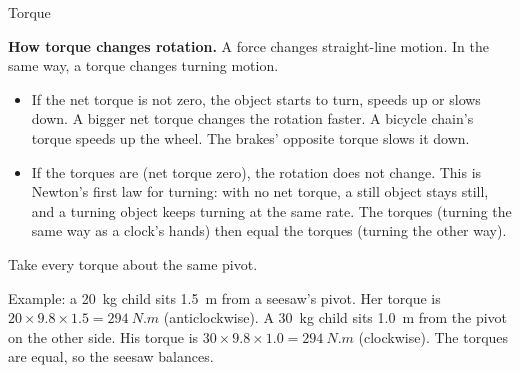 \begin{formulacard}{Torque}
  \begin{symbols}
  \end{symbols}
\end{formulacard}

\textbf{How torque changes rotation.} A force changes straight-line motion. In the same way, a
torque changes turning motion.
\begin{itemize}
  \item If the net torque is not zero, the object starts to turn, speeds up or slows down. A bigger
        net torque changes the rotation faster. A bicycle chain's torque speeds up the wheel. The
        brakes' opposite torque slows it down.
  \item If the torques are  (net torque zero), the rotation does not change. This is
        Newton's first law for turning: with no net torque, a still object stays still, and a
        turning object keeps turning at the same rate. The  torques (turning the
        same way as a clock's hands) then equal the  torques (turning the
        other way).
\end{itemize}

Take every torque about the same pivot.

Example: a \qty{20}{kg} child sits \qty{1.5}{m} from a seesaw's pivot. Her torque is
$20 \times 9.8 \times 1.5 = \qty{294}{N.m}$ (anticlockwise). A \qty{30}{kg} child sits
\qty{1.0}{m} from the pivot on the other side. His torque is $30 \times 9.8 \times 1.0 =
\qty{294}{N.m}$ (clockwise). The torques are equal, so the seesaw balances.

